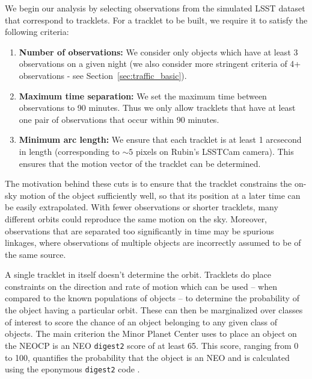 \documentclass[twocolumn]{aastex631}
\newcommand{\dig}{\texttt{digest2}}
\begin{document}
We begin our analysis by selecting observations from the simulated LSST dataset that correspond to tracklets. For a tracklet to be built, we require it to satisfy the following criteria:
\begin{enumerate}
    \item \textbf{Number of observations:} We consider only objects which have at least 3 observations on a given night (we also consider more stringent criteria of 4+ observations - see Section~\ref{sec:traffic_basic}).
    \item \textbf{Maximum time separation:} We set the maximum time between observations to 90 minutes. Thus we only allow tracklets that have at least one pair of observations that occur within 90 minutes.
    \item \textbf{Minimum arc length:} We ensure that each tracklet is at least 1 arcsecond in length (corresponding to ${\sim}5$ pixels on Rubin's LSSTCam camera). This ensures that the motion vector of the tracklet can be determined.
\end{enumerate}
The motivation behind these cuts is to ensure that the tracklet constrains the on-sky motion of the object sufficiently well, so that its position at a later time can be easily extrapolated. With fewer observations or shorter tracklets, many different orbits could reproduce the same motion on the sky. Moreover, observations that are separated too significantly in time may be spurious linkages, where observations of multiple objects are incorrectly assumed to be of the same source.

A single tracklet in itself doesn't determine the orbit. Tracklets do place constraints on the direction and rate of motion which can be used -- when compared to the known populations of objects -- to determine the probability of the object having a particular orbit. These can then be marginalized over classes of interest to score the chance of an object belonging to any given class of objects. The main criterion the Minor Planet Center uses to place an object on the NEOCP is an NEO \dig{} score of at least 65. This score, ranging from 0 to 100, quantifies the probability that the object is an NEO and is calculated using the eponymous \dig{} code \citep{Keys+2019}.
\end{document}
